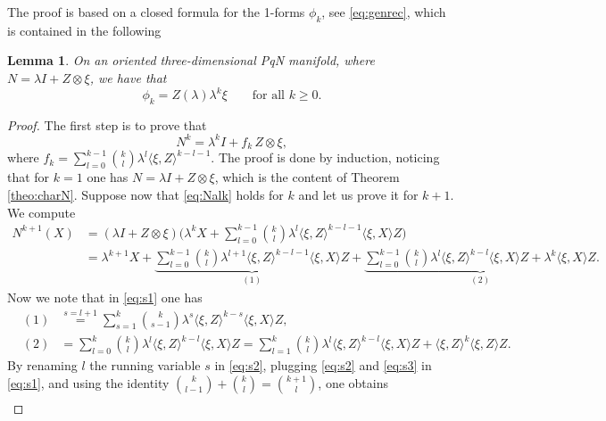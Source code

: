 \documentclass[12pt]{article}
\newtheorem{lem}[theorem]{Lemma}
\begin{document}
The proof is based on a closed formula for the 1-forms $\phi_k$, see \eqref{eq:genrec}, which is contained in the following
\begin{lem}\label{lem:phik}
	On an oriented three-dimensional PqN manifold, where $N=\lambda I+Z\otimes\xi$, we have that 
	\begin{equation}
		\phi_k=Z(\lambda)\lambda^k\xi\qquad\mbox{for all $k\geq 0$.}
		\label{eq:phik}
	\end{equation}
\end{lem}
\begin{proof}
	The first step is to prove %
	that 
	\begin{equation}
		N^k=\lambda^kI+f_k \,Z\otimes\xi,\label{eq:Nalk}
	\end{equation}
	where $f_k=\sum_{l=0}^{k-1}{k\choose l}\lambda^l\langle\xi,Z\rangle^{k-l-1}$. 
The proof is done by induction, noticing that for $k=1$ one has $N=\lambda I+Z\otimes \xi$, which is the content of Theorem \ref{theo:charN}.
Suppose now that \eqref{eq:Nalk} holds for $k$ and let us prove it for $k+1$. We compute
\begin{equation}
\label{eq:s1}
\begin{aligned}
N^{k+1}(X)&=(\lambda I+Z\otimes\xi)\Big(\lambda^kX+\sum_{l=0}^{k-1}{k\choose l}\lambda^l\langle\xi,Z\rangle^{k-l-1}\langle\xi,X\rangle Z\Big)
\\
&=\lambda^{k+1}X+\underbrace{\sum_{l=0}^{k-1}{k\choose l}\lambda^{l+1}\langle\xi,Z\rangle^{k-l-1}\langle\xi,X\rangle Z}_{(1)}+\underbrace{\sum_{l=0}^{k-1}{k\choose l}\lambda^{l}\langle\xi,Z\rangle^{k-l}\langle\xi,X\rangle Z+\lambda^k\langle\xi,X\rangle Z}_{(2)}.
\end{aligned}
\end{equation}
Now we note that in \eqref{eq:s1} one has
\begin{eqnarray}
&(1)&\stackrel{s=l+1}{=}\sum_{s=1}^{k}{k\choose s-1}\lambda^{s}\langle\xi,Z\rangle^{k-s}\langle\xi,X\rangle Z,\label{eq:s2}\\
&(2)&=\sum_{l=0}^k{k\choose l}\lambda^l\langle\xi,Z\rangle^{k-l}\langle\xi,X\rangle Z=\sum_{l=1}^k{k\choose l}\lambda^l\langle\xi,Z\rangle^{k-l}\langle\xi,X\rangle Z+\langle\xi,Z\rangle^k\langle\xi,Z\rangle Z.\label{eq:s3}
\end{eqnarray}
By renaming $l$ the running variable $s$ in \eqref{eq:s2}, plugging \eqref{eq:s2} and \eqref{eq:s3} in \eqref{eq:s1}, 
and using the identity ${k\choose l-1}+{k\choose l}={k+1\choose l}$, one obtains 
\begin{eqnarray*}

\end{eqnarray*}
\end{proof}
\end{document}
